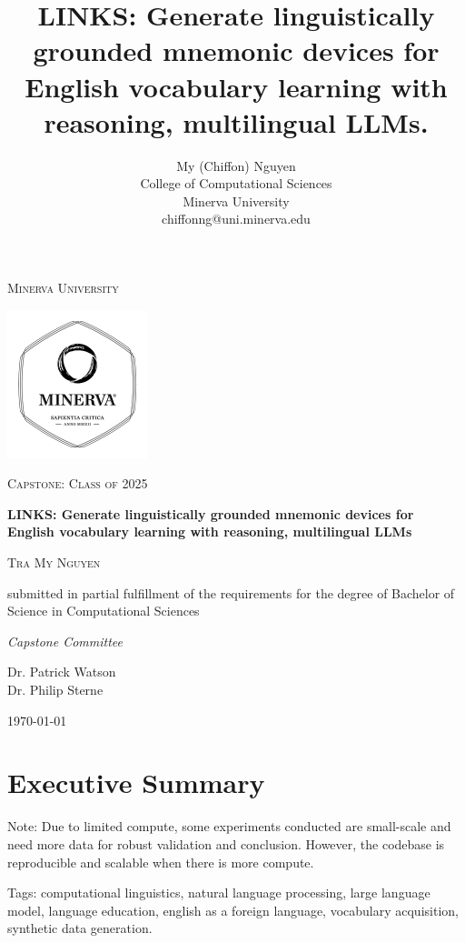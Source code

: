 \documentclass[11pt]{article}
\title{\textbf{LINKS}: Generate linguistically grounded mnemonic devices for English vocabulary learning with reasoning, multilingual LLMs.
}
\author{%
  My (Chiffon) Nguyen \\
  College of Computational Sciences \\
  Minerva University \\
  chiffonng@uni.minerva.edu
}
\begin{document}
\begin{titlepage}
  \centering
  {\scshape\LARGE Minerva University \par}
  \vspace{1cm}
  \includegraphics[width=0.4\linewidth]{figures/minerva_logo.pdf}
  {\scshape\Large Capstone: Class of 2025 \par}
  \vspace{1.5cm}
  {\huge\bfseries LINKS: Generate linguistically grounded mnemonic devices for English vocabulary learning with reasoning, multilingual LLMs \par}
  \vspace{2cm}
  {\scshape\large Tra My Nguyen \par}
  submitted in partial fulfillment of the requirements for the degree of Bachelor of Science in Computational Sciences \par
  \vspace{2cm}
  {\large\itshape Capstone Committee \par}
  Dr. Patrick Watson \\
  Dr. Philip Sterne

  \vfill
  {\large \today\par}
\end{titlepage}

\onecolumn
\section*{Executive Summary}
Note: Due to limited compute, some experiments conducted are small-scale and need more data for robust validation and conclusion. However, the codebase is reproducible and scalable when there is more compute.

Tags: computational linguistics, natural language processing, large language model, language education, english as a foreign language, vocabulary acquisition, synthetic data generation.

\clearpage
\end{document}
